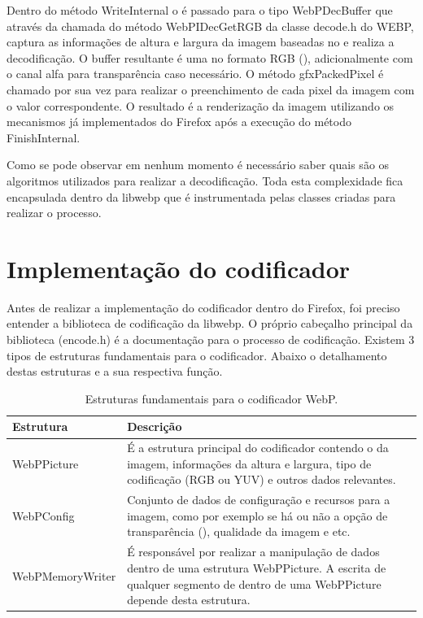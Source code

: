 \documentclass[espaco=simples,appendix=Name]{abnt}
\begin{document}
Dentro do método WriteInternal o  é passado para o tipo WebPDecBuffer que através da chamada do método WebPIDecGetRGB da classe decode.h do WEBP, captura as informações de altura e largura da imagem baseadas no  e realiza a decodificação. O buffer resultante é uma  no formato RGB (), adicionalmente com o canal alfa para transparência caso necessário. O método gfxPackedPixel é chamado por sua vez para realizar o preenchimento de cada pixel da imagem com o valor correspondente. O resultado é a renderização da imagem utilizando os mecanismos já implementados do Firefox após a execução do método FinishInternal.

Como se pode observar em nenhum momento é necessário saber quais são os algoritmos utilizados para realizar a decodificação. Toda esta complexidade fica encapsulada dentro da libwebp que é instrumentada pelas classes criadas para realizar o processo.

\section{Implementação do codificador}

Antes de realizar a implementação do codificador dentro do Firefox, foi preciso entender a biblioteca de codificação da libwebp. O próprio cabeçalho principal da biblioteca (encode.h) é a documentação para o processo de codificação. Existem 3 tipos de estruturas fundamentais para o codificador. Abaixo o detalhamento destas estruturas e a sua respectiva função.

\begin{table}[ht]
        \centering
        \caption{Estruturas fundamentais para o codificador WebP.
        \label{tbl:padc}}{
                \vspace{0.3cm}
                \begin{tabular}{|l|p{10cm}|}
                \hline
                        \textbf{Estrutura} & \textbf{Descrição} \\
                        \hline
                        WebPPicture		& É a estrutura principal do codificador contendo o \ingles{buffer} da imagem, informações da altura e largura, tipo de codificação (RGB ou YUV) e outros dados relevantes. \\
                        \hline
                        WebPConfig		& Conjunto de dados de configuração e recursos para a imagem, como por exemplo se há ou não a opção de transparência (\ingles{alpha}), qualidade da imagem e etc.  \\
                        \hline
                        WebPMemoryWriter	& É responsável por realizar a manipulação de dados dentro de uma estrutura WebPPicture. A escrita de qualquer segmento de \ingles{buffer} dentro de uma WebPPicture depende desta estrutura. \\
                        \hline
                \end{tabular}
                }
\end{table}
\end{document}
